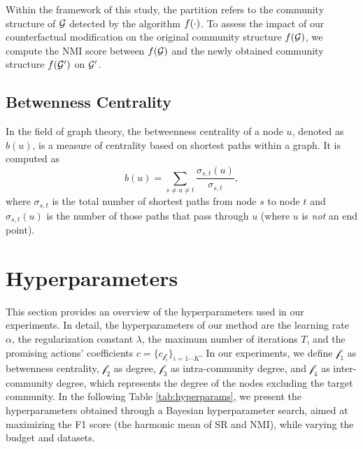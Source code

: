 Within the framework of this study, the partition refers to the community structure of $\mathcal{G}$ detected by the algorithm $f(\cdot)$. To assess the impact of our counterfactual modification on the original community structure $f(\mathcal{G})$, we compute the NMI score between $f(\mathcal{G})$ and the newly obtained community structure $f(\mathcal{G}')$ on $\mathcal{G}'$. 

\subsection{Betwenness Centrality}
\label{app:cent}
In the field of graph theory, the betweenness centrality of a node $u$, denoted as $b(u)$, is a measure of centrality based on shortest paths within a graph. It is computed as 
\begin{equation}
    b(u) = \sum_{s\neq u \neq t}\frac{\sigma_{s,t}(u)}{\sigma_{s,t}},
\end{equation} 
where $\sigma_{s,t}$ is the total number of shortest paths from node $s$ to node 
$t$ and $\sigma_{s,t}(u)$ is the number of those paths that pass through 
$u$ (where $u$ is \textit{not} an end point).


\section{Hyperparameters}
\label{app:hyp}

This section provides an overview of the hyperparameters used in our experiments.
In detail, the hyperparameters of our method are
the learning rate $\alpha$, the regularization constant $\lambda$,
the maximum number of iterations $T$, and the promising actions' coefficients $ c = \{c_{\mathcal{f}_i}\}_{i=1\cdots K}$.
In our experiments, we define $\mathcal{f}_1$ as betwenness centrality, $\mathcal{f}_2$ as degree, $\mathcal{f}_3$ as intra-community degree, and $\mathcal{f}_4$ as inter-community degree, which represents the degree of the nodes excluding the target community. In the following Table \ref{tab:hyperparams}, we present the hyperparameters obtained through a Bayesian hyperparameter search, aimed at maximizing the F1 score (the harmonic mean of SR and NMI), while varying the budget and datasets.

